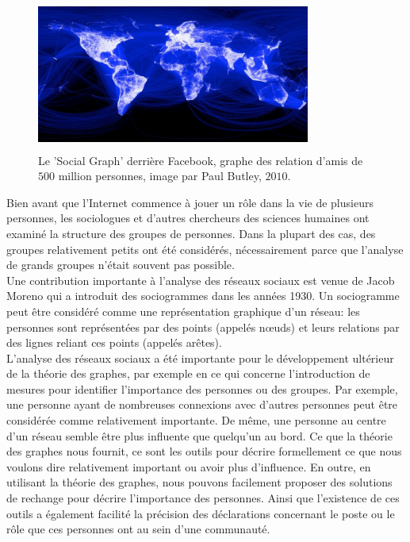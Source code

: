 \begin{figure}[h!]
\centering
\includegraphics[width=9cm,height=5cm]{./figures/facebook}
\caption{Le 'Social Graph' derrière Facebook, graphe des relation d'amis de $500$ million personnes, image par Paul Butley, $2010$.}
\label{Facebook}
\end{figure}
Bien avant que l'Internet commence à jouer un rôle dans la vie de plusieurs personnes, les sociologues et d'autres chercheurs des sciences humaines ont examiné la structure des groupes de personnes. Dans la plupart des cas, des groupes relativement petits ont été considérés, nécessairement parce que l'analyse de grands groupes n'était souvent pas possible.\\
Une contribution importante à l'analyse des réseaux sociaux est venue de Jacob Moreno qui a introduit des sociogrammes dans les années 1930. Un sociogramme peut être considéré comme une représentation graphique d'un réseau: les personnes sont représentées par des points (appelés nœuds) et leurs relations par des lignes reliant ces points (appelés arêtes).\\
L'analyse des réseaux sociaux a été importante pour le développement ultérieur de la théorie des graphes, par exemple en ce qui concerne l'introduction de mesures pour identifier l'importance des personnes ou des groupes. Par exemple, une personne ayant de nombreuses connexions avec d'autres personnes peut être considérée comme relativement importante. De même, une personne au centre d'un réseau semble être plus influente que quelqu'un au bord. Ce que la théorie des graphes nous fournit, ce sont les outils pour décrire formellement ce que nous voulons dire relativement important ou avoir plus d'influence. En outre, en utilisant la théorie des graphes, nous pouvons facilement proposer des solutions de rechange pour décrire l'importance des personnes. Ainsi que l'existence de ces outils a également facilité la précision des déclarations concernant le poste ou le rôle que ces personnes ont au sein d'une communauté.
